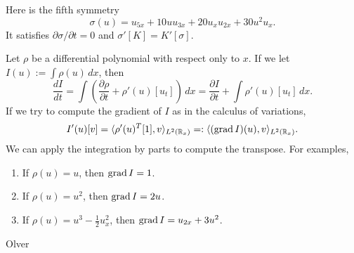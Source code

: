 \documentclass{../../../small}
\begin{document}
Here is the fifth symmetry
\[\sigma(u)=u_{5x}+10uu_{3x}+20u_xu_{2x}+30u^2u_x.\]
It satisfies $\partial\sigma/\partial t=0$ and $\sigma'[K]=K'[\sigma]$.


\bigskip
Let $\rho$ be a differential polynomial with respect only to $x$.
If we let $I(u):=\int\rho(u)\,dx$, then
\[\frac{dI}{dt}=\int(\frac{\partial\rho}{\partial t}+\rho'(u)[u_t])\,dx=\frac{\partial I}{\partial t}+\int\rho'(u)[u_t]\,dx.\]
If we try to compute the gradient of $I$ as in the calculus of variations,
\[I'(u)[v]=\langle\rho'(u)^T[1],v\rangle_{L^2(\mathbb{R}_x)}=:\langle(\operatorname{grad} I)(u),v\rangle_{L^2(\mathbb{R}_x)}.\]
We can apply the integration by parts to compute the transpose.
For examples,
\begin{enumerate}
\item If $\rho(u)=u$, then $\operatorname{grad} I=1$.
\item If $\rho(u)=u^2$, then $\operatorname{grad} I=2u$.
\item If $\rho(u)=u^3-\frac12u_x^2$, then $\operatorname{grad} I=u_{2x}+3u^2$.
\end{enumerate}

Olver
\end{document}

